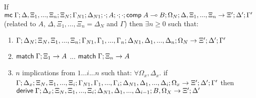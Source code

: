 \begin{lemma}
   If $\mathsf{mc} \; \Gamma; \Delta, \Xi_1, ..., \Xi_n; \Xi_N; \Gamma_{N1}; \Delta_{N1}; \cdot; A; \cdot; \cdot; \mathsf{comp} \; A \multimap B; \Omega_N; \Delta, \Xi_1, ..., \Xi_n \rightarrow \Xi'; \Delta'; \Gamma'$ (related to $A$, $\Delta, \Xi_1, ..., \Xi_n = \Delta_N$ and $\Gamma$) then $\exists n \geq 0$ such that:
   
   \begin{enumerate}
      \item $\do \Gamma; \Delta_N; \Xi_N, \Xi_1, ..., \Xi_n; \Gamma_{N1}, \Gamma_1, ..., \Gamma_n; \Delta_{N1}, \Delta_1, ..., \Delta_n; \Omega_N \rightarrow \Xi'; \Delta'; \Gamma'$
      \item $\mathsf{match} \; \Gamma; \Xi_1 \rightarrow A$ ... $\mathsf{match} \; \Gamma; \Xi_n \rightarrow A$
      \item $n$ implications from $1...i...n$ such that: $\forall \Omega_x, \Delta_x.$ if $\do \Gamma; \Delta_x; \Xi_N, \Xi_1, ..., \Xi_i; \Gamma_{N1}, \Gamma_1, ..., \Gamma_i; \Delta_{N1}, \Delta_1, ..., \Delta_i; \Omega_x \rightarrow \Xi'; \Delta'; \Gamma'$ then $\mathsf{derive} \; \Gamma; \Delta_x; \Xi_N, \Xi_1, ..., \Xi_i; \Delta_{N1}, \Delta_1, ..., \Delta_{i-1}; B, \Omega_X \rightarrow \Xi'; \Delta'$
   \end{enumerate}
\end{lemma}

